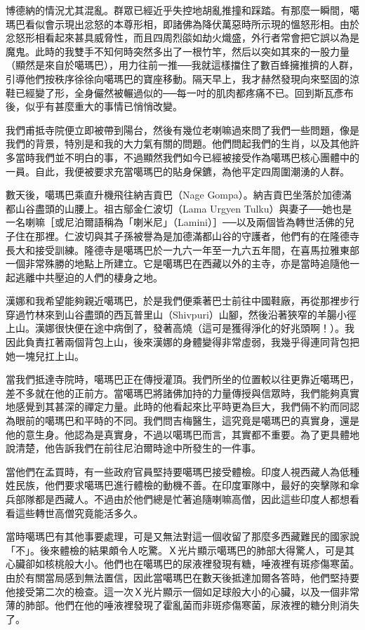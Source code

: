 博德納的情況尤其混亂。群眾已經近乎失控地胡亂推撞和踩踏。有那麼一瞬間，噶瑪巴看似會示現出忿怒的本尊形相，即諸佛為降伏萬惡時所示現的慍怒形相。由於忿怒形相看起來甚具威脅性，而且四周烈燄如劫火熾盛，外行者常會把它誤以為是魔鬼。此時的我雙手不知何時突然多出了一根竹竿，然后以突如其來的一股力量（顯然是來自於噶瑪巴），用力往前一推──我就這樣擋住了數百蜂擁推擠的人群，引導他們按秩序徐徐向噶瑪巴的寶座移動。隔天早上，我才赫然發現向來堅固的涼鞋已經變了形，全身儼然被輾過似的──每一吋的肌肉都疼痛不已。回到斯瓦彥布後，似乎有甚麼重大的事情已悄悄改變。

我們甫抵寺院便立即被帶到陽台，然後有幾位老喇嘛過來問了我們一些問題，像是我們的背景，特別是和我的大力氣有關的問題。他們問起我們的生肖，以及其他許多當時我們並不明白的事，不過顯然我們如今已經被接受作為噶瑪巴核心團體中的一員。自此，我便被要求充當噶瑪巴的貼身保鑣，為他平定四周圍潮湧的人群。　

數天後，噶瑪巴乘直升機飛往納吉貢巴（Nage
Gompa）。納吉貢巴坐落於加德滿都山谷盡頭的山腰上。祖古鄔金仁波切（Lama
Urgyen
Tulku）與妻子──她也是一名喇嘛［或尼泊爾語稱為「喇米尼」（Lamini）］──以及兩個皆為轉世活佛的兒子住在那裡。仁波切與其子孫被譽為是加德滿都山谷的守護者，他們有的在隆德寺長大和接受訓練。隆德寺是噶瑪巴於一九六一年至一九六五年間，在喜馬拉雅東部一個非常殊勝的地點上所建立。它是噶瑪巴在西藏以外的主寺，亦是當時追隨他一起逃離中共壓迫的人們的棲身之地。

漢娜和我希望能夠親近噶瑪巴，於是我們便乘著巴士前往中國鞋廠，再從那裡步行穿過竹林來到山谷盡頭的西瓦普里山（Shivpuri）山腳，然後沿著狹窄的羊腸小徑上山。漢娜很快便在途中病倒了，發著高燒（這可是獲得淨化的好兆頭啊！）。我因此負責扛著兩個背包上山，後來漢娜的身體變得非常虛弱，我幾乎得連同背包把她一塊兒扛上山。

當我們抵達寺院時，噶瑪巴正在傳授灌頂。我們所坐的位置較以往更靠近噶瑪巴，差不多就在他的正前方。當噶瑪巴將諸佛加持的力量傳授與信眾時，我們能夠真實地感覺到其甚深的禪定力量。此時的他看起來比平時更為巨大，我們倆不約而同認為眼前的噶瑪巴和平時的不同。我們問吉梅醫生，這究竟是噶瑪巴的真實身，還是他的意生身。他認為是真實身，不過以噶瑪巴而言，其實都不重要。為了更具體地說清楚，他告訴我們在前往尼泊爾時途中所發生的一件事。

當他們在孟買時，有一些政府官員堅持要噶瑪巴接受體檢。印度人視西藏人為低種姓民族，他們要求噶瑪巴進行體檢的動機不善。在印度軍隊中，最好的突擊隊和傘兵部隊都是西藏人。不過由於他們總是忙著追隨喇嘛高僧，因此這些印度人都想看看這些轉世高僧究竟能活多久。

當時噶瑪巴有其他事要處理，可是又無法對這一個收留了那麼多西藏難民的國家說「不」。後來體檢的結果頗令人吃驚。Ｘ光片顯示噶瑪巴的肺部大得驚人，可是其心臟卻如核桃般大小。他們也在噶瑪巴的尿液裡發現有糖，唾液裡有斑疹傷寒菌。由於有關當局感到無法置信，因此當噶瑪巴在數天後抵達加爾各答時，他們堅持要他接受第二次的檢查。這一次Ｘ光片顯示一個如足球般大小的心臟，以及一個非常薄的肺部。他們在他的唾液裡發現了霍亂菌而非斑疹傷寒菌，尿液裡的糖分則消失了。

